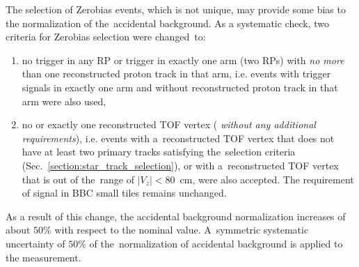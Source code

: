 The selection of Zerobias events, which is not unique, may provide some bias to the normalization of the~accidental background. As a systematic check, two criteria for  Zerobias selection were changed~to:
\begin{enumerate}
	\item no trigger in any RP or trigger in exactly one arm (two RPs) with \textit{no more} than one reconstructed proton track in that arm, i.e. events with trigger signals in exactly one arm and without reconstructed proton track in that arm were also used,
	\item no  or exactly one reconstructed TOF vertex (%
	\textit{without any additional requirements}), i.e. events with a~reconstructed TOF vertex that does not have at least two primary tracks satisfying the~selection criteria (Sec.~\ref{section:star_track_selection}), or with a~reconstructed TOF vertex that is out of the~range of $|V_z|<80$~cm, were also accepted. The requirement of signal in BBC small tiles remains unchanged. 
\end{enumerate}
As a result of this change, %
the accidental background normalization increases of about $50\%$ with respect to the nominal value.
A~symmetric systematic uncertainty of $50\%$ of the~normalization of accidental background is applied to the measurement.
\begin{comment}
\begin{figure}[h!]
	\centering
	\texttt{[image: chapters/chrgSTAR/img/accidentals/accidentalBkg\_test.pdf]}
	\texttt{[image: chapters/chrgSTAR/img/accidentals/accidentalBkg\_test.pdf]}
	\texttt{[image: chapters/chrgSTAR/img/accidentals/accidentalBkg\_test.pdf]}
	\texttt{[image: chapters/chrgSTAR/img/accidentals/accidentalBkg\_test.pdf]}
	\caption{Uncorrected distributions of the reconstructed $\xi$ for events with proton reconstructed in (top left) EU, (top right) ED, (bottom left) WU and (bottom right) WD arms. The~accidental background contribution calculated with changed Zerobias selection criteria is also shown.}
	\label{fig:STARaccidentalsXiSyst}
\end{figure}
\end{comment}



